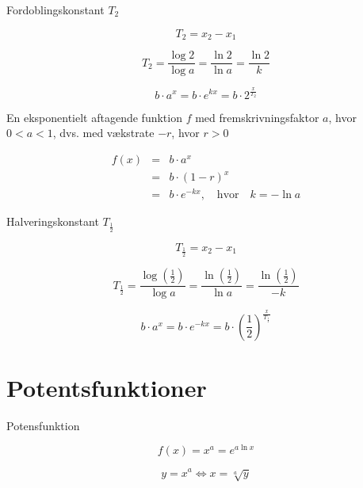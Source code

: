 \documentclass[11pt,a4paper,landscape,twocolumn,fleqn,leqno]{article}
\begin{document}
Fordoblingskonstant $T_2$

\begin{equation}
T_2 = x_2 - x_1
\end{equation}

\begin{equation}
T_2 = \frac{\log 2}{\log a} = \frac{\ln 2}{\ln a} = \frac{\ln 2}{k}
\end{equation}

\begin{equation}
b \cdot a^x = b \cdot e^{kx} = b \cdot 2^{\frac{x}{T_2}}
\end{equation}

En eksponentielt aftagende funktion $f$ med fremskrivningsfaktor $a$, hvor $0 < a < 1$, dvs. med vækstrate $-r$, hvor $r > 0$

\begin{eqnarray}
f(x) & = & b \cdot a^x \\
 & = & b \cdot (1-r)^x \nonumber \\
 & = & b \cdot e^{-kx}, \quad \text{hvor} \quad k = -\ln a \nonumber
\end{eqnarray}

Halveringskonstant $T_{\frac{1}{2}}$

\begin{equation}
T_{\frac{1}{2}} = x_2 - x_1
\end{equation}

\begin{equation}
T_{\frac{1}{2}} = \frac{\log\left(\frac{1}{2}\right)}{\log a} = \frac{\ln\left(\frac{1}{2}\right)}{\ln a} = \frac{\ln\left(\frac{1}{2}\right)}{-k}
\end{equation}

\begin{equation}
b \cdot a^x = b \cdot e^{-kx} = b \cdot \left(\frac{1}{2}\right)^{\frac{x}{T_{\frac{1}{2}}}}
\end{equation}

\section{Potentsfunktioner}

Potensfunktion

\begin{equation}
f(x) = x^a = e^{a\ln x}
\end{equation}

\begin{equation}
y = x^a \Leftrightarrow x = \sqrt[a]{y}
\end{equation}
\end{document}
